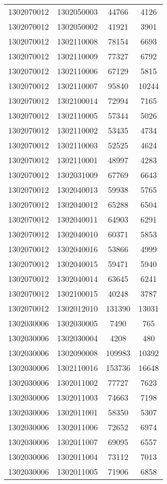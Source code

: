 \begin{longtable}[h]{llcc}
		1302070012 & 1302050003 & 44766 & 4126\\
		1302070012 & 1302050002 & 41921 & 3901\\
		1302070012 & 1302110008 & 78154 & 6693\\
		1302070012 & 1302110009 & 77327 & 6792\\
		1302070012 & 1302110006 & 67129 & 5815\\
		1302070012 & 1302110007 & 95840 & 10244\\
		1302070012 & 1302100014 & 72994 & 7165\\
		1302070012 & 1302110005 & 57344 & 5026\\
		1302070012 & 1302110002 & 53435 & 4734\\
		1302070012 & 1302110003 & 52525 & 4624\\
		1302070012 & 1302110001 & 48997 & 4283\\
		1302070012 & 1302031009 & 67769 & 6643\\
		1302070012 & 1302040013 & 59938 & 5765\\
		1302070012 & 1302040012 & 65288 & 6504\\
		1302070012 & 1302040011 & 64903 & 6291\\
		1302070012 & 1302040010 & 60371 & 5853\\
		1302070012 & 1302040016 & 53866 & 4999\\
		1302070012 & 1302040015 & 59471 & 5940\\
		1302070012 & 1302040014 & 63645 & 6241\\
		1302070012 & 1302100015 & 40248 & 3787\\
		1302070012 & 1302012010 & 131390 & 13031\\
		1302030006 & 1302030005 & 7490 & 765\\
		1302030006 & 1302030004 & 4208 & 480\\
		1302030006 & 1302090008 & 109983 & 10392\\
		1302030006 & 1302110016 & 153736 & 16648\\
		1302030006 & 1302011002 & 77727 & 7623\\
		1302030006 & 1302011003 & 74663 & 7198\\
		1302030006 & 1302011001 & 58350 & 5307\\
		1302030006 & 1302011006 & 72652 & 6974\\
		1302030006 & 1302011007 & 69095 & 6557\\
		1302030006 & 1302011004 & 73112 & 7013\\
		1302030006 & 1302011005 & 71906 & 6858\\

\end{longtable}
